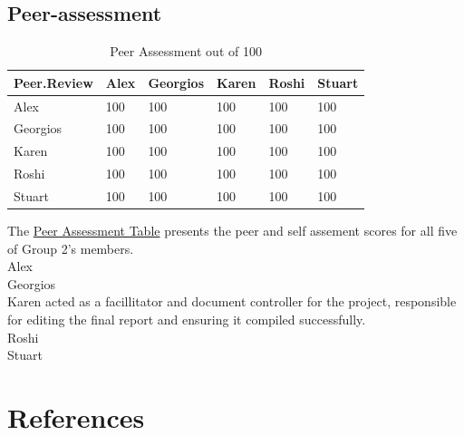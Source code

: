 \documentclass[10pt]{article}\usepackage[]{graphicx}\usepackage[]{color}
\begin{document}
\subsection{Peer-assessment}


\begin{table}[H]
\centering
\caption{Peer Assessment out of 100} 
\label{tab:two}
\begin{tabular}{llllll}
  \hline
Peer.Review & Alex & Georgios & Karen & Roshi & Stuart \\ 
  \hline
Alex & 100 & 100 & 100 & 100 & 100 \\ 
  Georgios & 100 & 100 & 100 & 100 & 100 \\ 
  Karen & 100 & 100 & 100 & 100 & 100 \\ 
  Roshi & 100 & 100 & 100 & 100 & 100 \\ 
  Stuart & 100 & 100 & 100 & 100 & 100 \\ 
   \hline
\end{tabular}
\end{table}


The \hyperref[tab:two]{Peer Assessment Table} presents the peer and self assement scores for all five of Group 2's members.\\

Alex\\

Georgios\\

Karen acted as a facillitator and document controller for the project, responsible for editing the final report and ensuring it compiled successfully. \\

Roshi\\

Stuart\\



\pagebreak
\section*{References}\label{pubs}
\printbibliography[heading=none]
\end{document}

